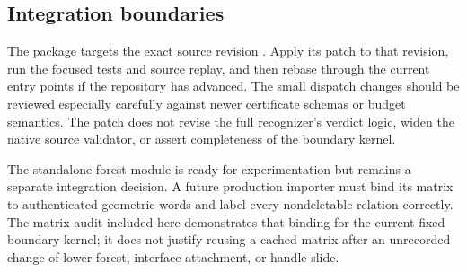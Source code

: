 \subsection{Integration boundaries}
The package targets the exact source revision \basecommit.  Apply its
patch to that revision, run the focused tests and source replay, and then
rebase through the current entry points if the repository has advanced.
The small dispatch changes should be reviewed especially carefully against
newer certificate schemas or budget semantics.  The patch does not revise
the full recognizer's verdict logic, widen the native source validator,
or assert completeness of the boundary kernel.

The standalone forest module is ready for experimentation but remains a
separate integration decision.  A future production importer must bind
its matrix to authenticated geometric words and label every nondeletable
relation correctly.  The matrix audit included here demonstrates that
binding for the current fixed boundary kernel; it does not justify
reusing a cached matrix after an unrecorded change of lower forest,
interface attachment, or handle slide.
